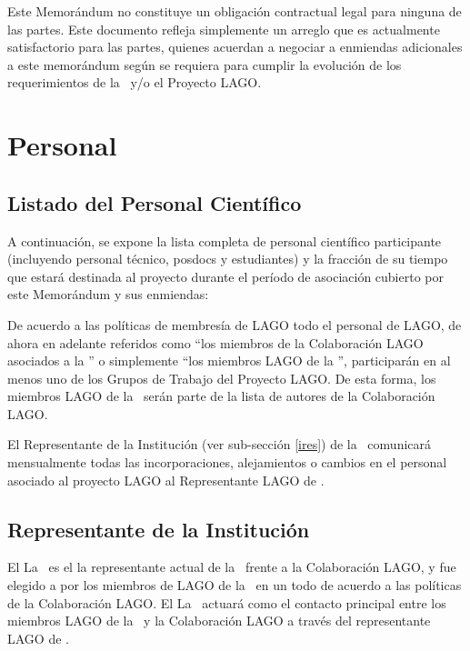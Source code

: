 Este Memorándum no constituye un obligación contractual legal para ninguna de
las partes. Este documento refleja simplemente un arreglo que es actualmente
satisfactorio para las partes, quienes acuerdan a negociar a enmiendas
adicionales a este memorándum según se requiera para cumplir la evolución de
los requerimientos de la \institution~y/o el Proyecto LAGO.

\section{Personal}

\subsection{Listado del Personal Científico}

A continuación, se expone la lista completa de personal científico participante
(incluyendo personal técnico, posdocs y estudiantes) y la fracción de su tiempo
que estará destinada al proyecto durante el período de asociación cubierto por
este Memorándum y sus enmiendas:



De acuerdo a las políticas de membresía de LAGO todo el personal de LAGO, de
ahora en adelante referidos como ``los miembros de la Colaboración LAGO
asociados a la \institution'' o simplemente ``los miembros LAGO de la
\institution'', participarán en al menos uno de los Grupos de Trabajo del
Proyecto LAGO. De esta forma, los miembros LAGO de la \institution~serán parte
de la lista de autores de la Colaboración LAGO.

El Representante de la Institución (ver sub-sección \ref{ires}) de la
\institution~comunicará mensualmente todas las incorporaciones, alejamientos o
cambios en el personal asociado al proyecto LAGO al Representante LAGO de
\country.

\subsection{Representante de la Institución\label{ires}}

\ifirg El \else La \fi \instrep~es
\ifirg el \else la \fi representante actual de la
\institution~frente a la Colaboración LAGO, y fue elegid\ifirg o \else a \fi por los miembros de
LAGO de la \institution~en un todo de acuerdo a las políticas de la
Colaboración LAGO. \ifirg El \else La \fi \instrep~actuará como el
contacto principal entre los miembros LAGO de la \institution~y la Colaboración
LAGO a través del representante LAGO de \country.

